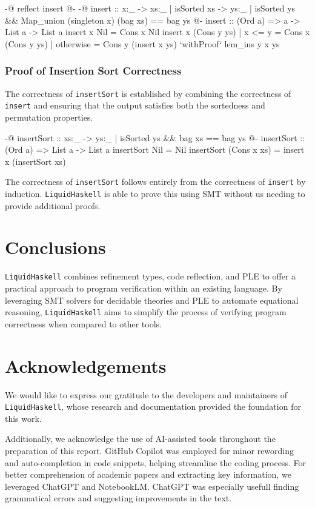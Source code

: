 \documentclass[]{rptuseminar}
\begin{document}
\begin{haskell}
{-@ reflect insert @-}
{-@ insert :: x:_ -> {xs:_ | isSorted xs} 
  -> {ys:_ | isSorted ys && Map_union (singleton x) (bag xs) == bag ys  } @-}
insert :: (Ord a) => a -> List a -> List a
insert x Nil = Cons x Nil
insert x (Cons y ys)
  | x <= y = Cons x (Cons y ys)
  | otherwise = Cons y (insert x ys) `withProof` lem_ins y x ys
\end{haskell}

\subsubsection{Proof of Insertion Sort Correctness}

The correctness of \texttt{insertSort} is established by combining the correctness of \texttt{insert} and ensuring that the output satisfies 
both the sortedness and permutation properties.

\begin{haskell}
{-@ insertSort :: xs:_ -> {ys:_ | isSorted ys && bag xs == bag ys} @-}
insertSort :: (Ord a) => List a -> List a
insertSort Nil = Nil
insertSort (Cons x xs) = insert x (insertSort xs)
\end{haskell}

The correctness of \texttt{insertSort} follows entirely from the correctness of \texttt{insert} by induction. 
\texttt{LiquidHaskell} is able to prove this using SMT without us needing to provide additional proofs.

\section{Conclusions}

\texttt{LiquidHaskell} combines refinement types, code reflection, and PLE to offer a practical approach to program verification within an existing language. By leveraging SMT solvers for decidable theories and PLE to automate equational reasoning, \texttt{LiquidHaskell} aims to simplify the process of verifying program correctness when compared to other tools.
\label{sec:conclusions}
\newpage
\section*{Acknowledgements}
We would like to express our gratitude to the developers and maintainers of \texttt{LiquidHaskell}, whose research and 
documentation provided the foundation for this work.

Additionally, we acknowledge the use of AI-assisted tools throughout the preparation of this report. 
GitHub Copilot was employed for minor rewording and auto-completion in code snippets, 
helping streamline the coding process. For better comprehension of academic papers and extracting key information, 
we leveraged ChatGPT and NotebookLM. ChatGPT was especially usefull finding grammatical errors and suggesting improvements in the text.
\newpage
\nocite{*}



\end{document}
